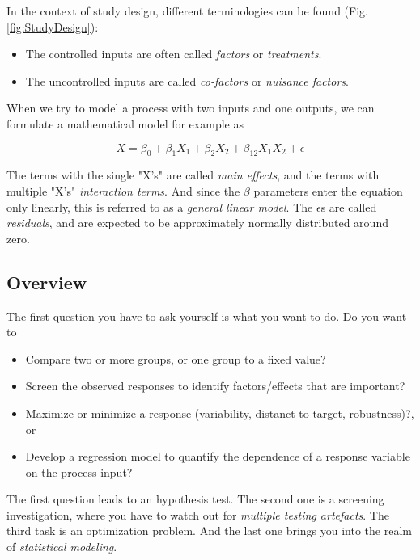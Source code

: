 In the context of study design, different terminologies can be found (Fig. \ref{fig:StudyDesign}):

\begin{itemize}
    \item{The controlled inputs are often called \emph{factors} or
            \emph{treatments}.}
    \item{The uncontrolled inputs are called \emph{co-factors} or
            \emph{nuisance factors}.}
\end{itemize}

When we try to model a process with two inputs and one outputs, we can
formulate a mathematical model for example as

\begin{equation}
    X = \beta_0 + \beta_1 X_1 + \beta_2 X_2 + \beta_{12} X_1 X_2 + \epsilon
\end{equation}

The terms with the single "X's" are called \emph{main effects}, and the terms with multiple "X's" \emph{interaction terms}. And since the $\beta$
parameters enter the equation only linearly, this is referred to as a \emph{general linear model}. The $\epsilon$s are called \emph{residuals}, and
are expected to be approximately normally distributed around zero.

\subsection{Overview}

The first question you have to ask yourself is what you want to do. Do you want to

\begin{itemize}
    \item{Compare two or more groups, or one group to a fixed value?}
    \item{Screen the observed responses to identify
            factors/effects that are important?}
    \item{Maximize or minimize a response (variability, distanct to target,
            robustness)?, or}
    \item{Develop a regression model to quantify the dependence of a
            response variable on the process input?}
\end{itemize}

The first question leads to an hypothesis test. The second one is a screening investigation, where you have to watch out for \emph{multiple testing artefacts}. The third task is an optimization problem. And the last one brings you into the realm of \emph{statistical modeling}.

